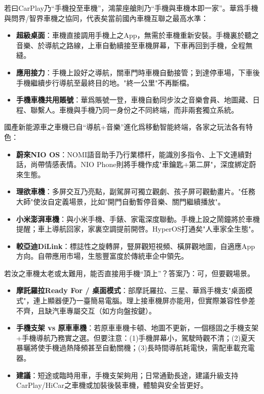 若曰CarPlay乃“手機投至車機”，鴻蒙座艙則乃“手機與車機本即一家”。華爲手機與問界/智界車機之協同，代表矣當前國內車機互聯之最高水準：

\begin{itemize}
  \item \textbf{超級桌面}：車機直接調用手機上之App，無需於車機重新安裝。手機裏於聽之音樂、於導航之路線，上車自動續接至車機屏幕，下車再回到手機，全程無縫。
  \item \textbf{應用接力}：手機上設好之導航，關車門時車機自動接管；到達停車場，下車後手機繼續步行導航至最終目的地。"終一公里"不再斷檔。
  \item \textbf{手機車機共用賬號}：華爲賬號一登，車機自動同步汝之音樂會員、地圖藏、日程、聯繫人。車機與手機乃同一身份之不同終端，而非兩套獨立系統。
\end{itemize}


國產新能源車之車機已自“導航+音樂”進化爲移動智能終端，各家之玩法各有特色：

\begin{itemize}
  \item \textbf{蔚來NIO OS}：NOMI語音助手乃行業標杆，能識別多指令、上下文連續對話，尚帶情感表情。NIO Phone則將手機作成"車鑰匙+第二屏"，深度綁定蔚來生態。
  \item \textbf{理欲車機}：多屏交互乃亮點，副駕屏可獨立觀劇、孩子屏可觀動畫片。"任務大師"使汝自定義場景，比如"開門自動暫停音樂、關門繼續播放"。
  \item \textbf{小米澎湃車機}：與小米手機、手錶、家電深度聯動。手機上設之鬧鐘將於車機提醒；車上導航回家，家裏空調提前開啓。HyperOS打通矣"人車家全生態"。
  \item \textbf{較亞迪DiLink}：標誌性之旋轉屏，豎屏觀短視頻、橫屏觀地圖，自適應App方向。自帶應用市場，生態豐富度於傳統車企中領先。
\end{itemize}


若汝之車機太老或太難用，能否直接用手機“頂上”？答案乃：可，但要觀場景。

\begin{itemize}
  \item \textbf{摩託羅拉Ready For / 桌面模式}：部摩託羅拉、三星、華爲手機支"桌面模式"，連上顯器便乃一臺簡易電腦。理上接車機屏亦能用，但實際兼容性參差不齊，且缺汽車專屬交互（如方向盤按鍵）。
  \item \textbf{手機支架 vs 原車車機}：若原車車機卡頓、地圖不更新，一個穩固之手機支架+手機導航乃務實之選。但要注意：(1)手機屏幕小，駕駛時觀不清；(2)夏天暴曬將使手機過熱降頻甚至自動關機；(3)長時間導航耗電快，需配車載充電器。
  \item \textbf{建議}：短途或臨時用車，手機支架夠用；日常通勤長途，建議升級支持CarPlay/HiCar之車機或加裝後裝車機，體驗與安全皆更好。
\end{itemize}

